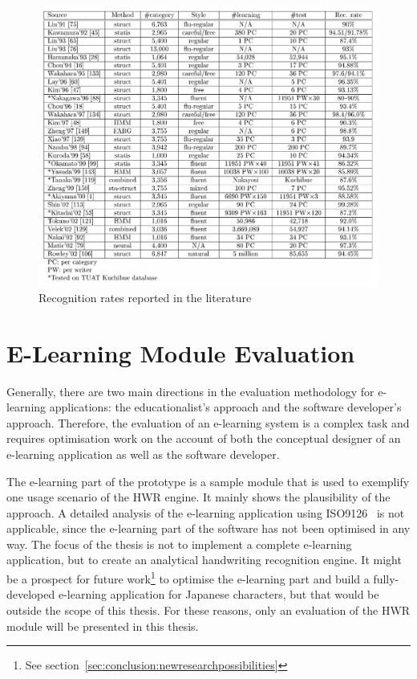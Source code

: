 \begin{figure}[htbp]
  \begin{center}
    \includegraphics[scale=0.6]{images/recognitionRatesLiuJaeger.png}
    \caption{Recognition rates reported in the literature}
    \label{fig:recognitionratesreported}
  \end{center}
\end{figure}

\section{E-Learning Module Evaluation}
\label{sec:eval:elearning}
Generally, there are two main directions in the evaluation methodology
for e-learning applications: the educationalist's approach and the 
software developer's approach.
Therefore, the evaluation of an e-learning system is a complex task
and requires optimisation work on the account of both the conceptual
designer of an e-learning application as well as the software developer.

The e-learning part of the prototype is a sample module that is used 
to exemplify one usage scenario of the HWR engine. 
It mainly shows the plausibility of the approach. A detailed analysis of the
e-learning application using ISO9126~ is not applicable,
since the e-learning part of the software has not been optimised in any way.
The focus of the thesis is not to implement a complete e-learning application,
but to create an analytical handwriting recognition engine.
It might be a prospect for future 
work\footnote{See section~\ref{sec:conclusion:newresearchpossibilities}}
to optimise the e-learning part and build a fully-developed e-learning
application for Japanese characters, but that would be outside the scope of 
this thesis. For these reasons, only an evaluation of the HWR module
will be presented in this thesis.

